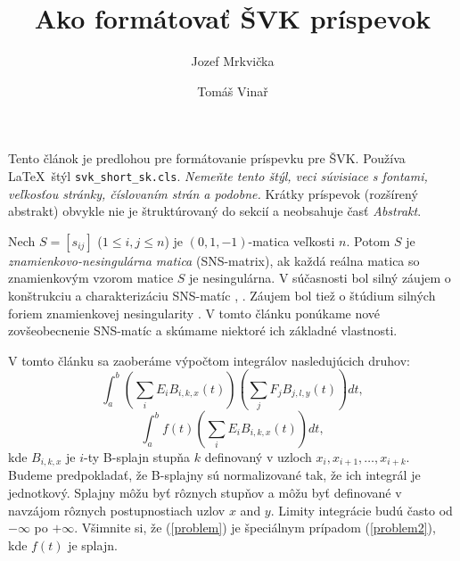\documentclass{svk_short_sk}
\begin{document}
\title{Ako formátovať ŠVK príspevok}

\author{Jozef Mrkvička
\and 
Tomáš Vinař
}




\maketitle

Tento článok je predlohou pre formátovanie príspevku pre ŠVK.
Používa \LaTeX\ štýl {\tt svk\_short\_sk.cls}.
\emph{Nemeňte tento štýl, veci súvisiace s fontami,
veľkosťou stránky, číslovaním strán a podobne.} Krátky príspevok (rozšírený 
abstrakt) obvykle nie je štruktúrovaný do sekcií a 
neobsahuje časť \emph{Abstrakt}.

Nech $S=[s_{ij}]$ ($1\leq i,j\leq n$) je $(0,1,-1)$-matica
veľkosti $n$. Potom $S$ je {\em znamienkovo-nesingulárna matica}
(SNS-matrix), ak každá reálna matica so znamienkovým vzorom
matice $S$ je nesingulárna. V súčasnosti bol silný záujem
o konštrukciu a charakterizáciu
SNS-matíc \cite{bs}, \cite{klm}. Záujem bol tiež o štúdium silných foriem
znamienkovej nesingularity \cite{djd}. V tomto článku ponúkame
nové zovšeobecnenie SNS-matíc a skúmame niektoré ich základné vlastnosti.

V tomto článku sa zaoberáme výpočtom integrálov nasledujúcich druhov:
\begin{equation}
\int_a^b \left( \sum_i E_i B_{i,k,x}(t) \right)
         \left( \sum_j F_j B_{j,l,y}(t) \right) dt,\label{problem}
\end{equation}
\begin{equation}
\int_a^b f(t) \left( \sum_i E_i B_{i,k,x}(t) \right) dt,\label{problem2}
\end{equation}
kde $B_{i,k,x}$ je $i$-ty B-splajn stupňa $k$ definovaný v uzloch
$x_i, x_{i+1}, \ldots, x_{i+k}$.
Budeme predpokladať, že B-splajny sú normalizované tak, že ich integrál je 
jednotkový.
Splajny môžu byť rôznych stupňov a môžu byť definované v navzájom rôznych 
postupnostiach uzlov
$x$ and $y$.
Limity integrácie budú často
od $-\infty$ po
$+\infty$. Všimnite si, že (\ref{problem}) je špeciálnym prípadom
(\ref{problem2}),
kde $f(t)$ je splajn.
\end{document}
